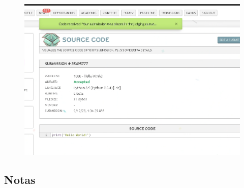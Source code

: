 \begin{enumerate}
    \begin{figure}[H]
        \centering
            \includegraphics[scale=0.45]{pictures/apendices/apendice_b_23.png}
    \end{figure}
\end{enumerate}

\clearpage

\subsection{Notas}

